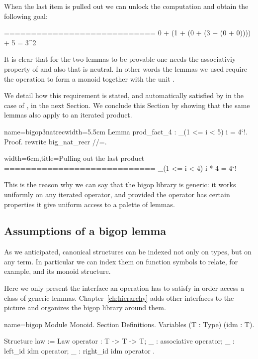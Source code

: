 When the last item is pulled out we can unlock the computation
and obtain the following goal:

\begin{coqout}{}{}
============================
0 + (1 + (0 + (3 + (0 + 0)))) + 5 = 3^2
\end{coqout}

It is clear that for the two lemmas to be provable
one needs the associativiy property of  and also that
 is neutral.
In other words the lemmas we used require the operation  to form
a monoid together with the unit .

We detail how this requirement is stated, and automatically satisfied by
\Coq{} in the case of , in the next Section.  We conclude this
Section by showing that the same lemmas also apply to an iterated
product.

\begin{coq}{name=bigop3natrec}{width=5.5cm}
Lemma prod_fact_4 : 
  \prod_(1 <= i < 5) i = 4`!.
Proof.
rewrite big_nat_recr //=.
\end{coq}
\begin{coqout}{}{width=6cm,title=Pulling out the last product}
============================
\prod_(1 <= i < 4) i * 4 = 4`!
\end{coqout}

This is the reason why we can say that the bigop library is generic:
it works uniformly on any iterated operator, and provided the operator
has certain properties it give uniform access to a palette of lemmas.

\subsection{Assumptions of a bigop lemma}\label{sec:bigoplemmas}

As we anticipated, canonical structures can be indexed not only on
types, but on any term.  In particular we can index them on function
symbols to relate, for example,  and its monoid structure.

Here we only present the  interface an operation has to
satisfy in order access a class of generic lemmas.
Chapter~\ref{ch:hierarchy} adds other interfaces to the picture and organizes
the bigop library around them.

\begin{coq}{name=bigop}{}
Module Monoid.
Section Definitions.
Variables (T : Type) (idm : T).

Structure law := Law {
  operator : T -> T -> T;
  _ : associative operator;
  _ : left_id idm operator;
  _ : right_id idm operator
}.
\end{coq}


